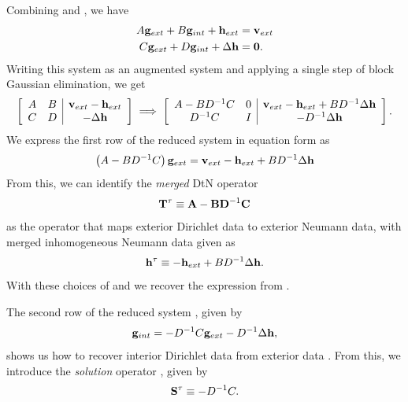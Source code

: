 Combining  and , we have
\begin{equation}
\begin{aligned}
A\mathbf g_{ext} + B\mathbf g_{int} + \mathbf h_{ext} & = \mathbf v_{ext} \\
C\mathbf g_{ext} + D\mathbf g_{int} + \Delta \mathbf h & = \mathbf 0.
\end{aligned}
\end{equation}
Writing this system as an augmented system and applying a single step of block Gaussian elimination, we get
\begin{equation}
\left[
\begin{array}{cc|c}
A & B & \mathbf v_{ext} - \mathbf h_{ext}\\
C & D & -\Delta \mathbf h\\
\end{array}\right]
\;
\Longrightarrow 
\;
\left[
\begin{array}{cc|c}
A - BD^{-1}C & 0 & \mathbf v_{ext} - \mathbf h_{ext} + B D^{-1}\Delta \mathbf h\\
D^{-1}C      & I & -D^{-1}\Delta \mathbf h
\end{array}\right].
\label{eq:reduced_system}
\end{equation}
We express the first row of the reduced system in equation form as 
\begin{equation}
\left(A - BD^{-1}C\right) \mathbf g_{ext} = \mathbf v_{ext} - \mathbf h_{ext} + B D^{-1}\Delta \mathbf h
\label{eq:complete_ops}
\end{equation}
From this, we can identify the {\em merged} DtN operator 
\begin{equation}
\mathbf T^{\tau} \equiv \mathbf{A} - \mathbf{B} \mathbf{D}^{-1} \mathbf{C} 
\label{eq:Ttau-merged}
\end{equation}
as the operator that maps exterior Dirichlet data to exterior Neumann data, with merged inhomogeneous Neumann data given as
\begin{equation}
\mathbf h^{\tau} \equiv -\mathbf h_{ext} + B D^{-1}\Delta \mathbf h. 
\label{eq:htau-merged}
\end{equation}
With these choices of \Ttau and \htau  we recover the expression from .

The second row of the reduced system , given by 
\begin{equation}
\mathbf g_{int} = -D^{-1}C \mathbf g_{ext} -D^{-1} \Delta \mathbf h,
\end{equation}
shows us how to recover interior Dirichlet data \gint  from exterior data \gext.  
From this, we introduce the {\em solution} operator \Stau, given by 
\begin{equation}
\mathbf S^{\tau} \equiv -D^{-1}C.
\label{eq:Stau-merged}
\end{equation}


